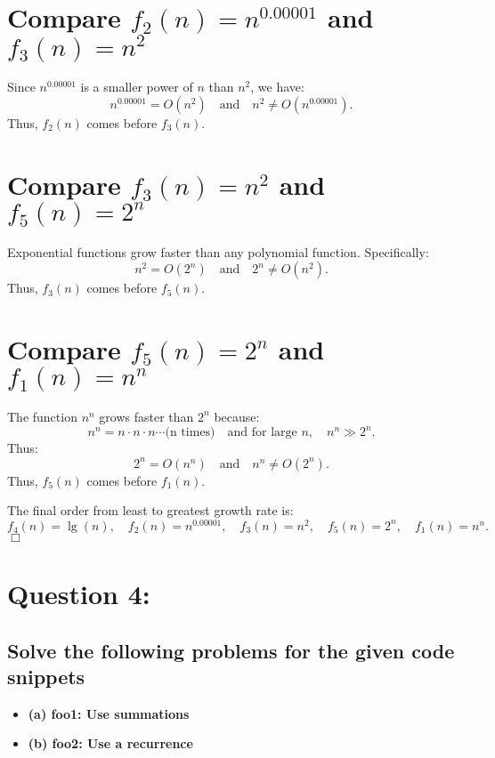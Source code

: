 \documentclass{article}
\begin{document}
\section*{Compare \( f_2(n) = n^{0.00001} \) and \( f_3(n) = n^2 \)}  
Since \( n^{0.00001} \) is a smaller power of \( n \) than \( n^2 \), we have:
\[
n^{0.00001} = O(n^2) \quad \text{and} \quad n^2 \neq O(n^{0.00001}).
\]
Thus, \( f_2(n) \) comes before \( f_3(n) \).

\section*{Compare \( f_3(n) = n^2 \) and \( f_5(n) = 2^n \)}  
Exponential functions grow faster than any polynomial function. Specifically:
\[
n^2 = O(2^n) \quad \text{and} \quad 2^n \neq O(n^2).
\]
Thus, \( f_3(n) \) comes before \( f_5(n) \).

\section*{Compare \( f_5(n) = 2^n \) and \( f_1(n) = n^n \)}  
The function \( n^n \) grows faster than \( 2^n \) because:
\[
n^n = n \cdot n \cdot n \cdots \text{(n times)} \quad \text{and for large } n, \quad n^n \gg 2^n.
\]
Thus:
\[
2^n = O(n^n) \quad \text{and} \quad n^n \neq O(2^n).
\]
Thus, \( f_5(n) \) comes before \( f_1(n) \).

The final order from least to greatest growth rate is:
\[
f_4(n) = \lg(n), \quad f_2(n) = n^{0.00001}, \quad f_3(n) = n^2, \quad f_5(n) = 2^n, \quad f_1(n) = n^n.
\]
\(\Box\)

\pagebreak

\section*{Question 4:}
\subsection*{Solve the following problems for the given code snippets}

\begin{itemize}
    \item \textbf{(a) foo1: Use summations}
    \item \textbf{(b) foo2: Use a recurrence}
\end{itemize}
\end{document}
